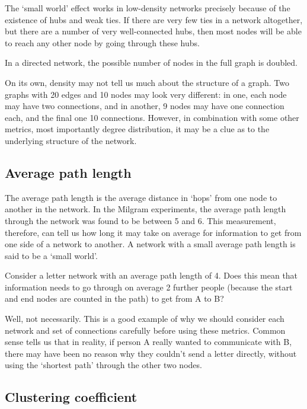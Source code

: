 \documentclass[
]{book}
\begin{document}
The `small world' effect works in low-density networks precisely because of the existence of hubs and weak ties. If there are very few ties in a network altogether, but there are a number of very well-connected hubs, then most nodes will be able to reach any other node by going through these hubs.

In a directed network, the possible number of nodes in the full graph is doubled.

On its own, density may not tell us much about the structure of a graph. Two graphs with 20 edges and 10 nodes may look very different: in one, each node may have two connections, and in another, 9 nodes may have one connection each, and the final one 10 connections. However, in combination with some other metrics, most importantly degree distribution, it may be a clue as to the underlying structure of the network.

\hypertarget{average-path-length}{%
\subsection{Average path length}\label{average-path-length}}

The average path length is the average distance in `hops' from one node to another in the network. In the Milgram experiments, the average path length through the network was found to be between 5 and 6. This measurement, therefore, can tell us how long it may take on average for information to get from one side of a network to another. A network with a small average path length is said to be a `small world'.

Consider a letter network with an average path length of 4. Does this mean that information needs to go through on average 2 further people (because the start and end nodes are counted in the path) to get from A to B?

Well, not necessarily. This is a good example of why we should consider each network and set of connections carefully before using these metrics. Common sense tells us that in reality, if person A really wanted to communicate with B, there may have been no reason why they couldn't send a letter directly, without using the `shortest path' through the other two nodes.

\hypertarget{clustering-coefficient}{%
\subsection{Clustering coefficient}\label{clustering-coefficient}}
\end{document}
